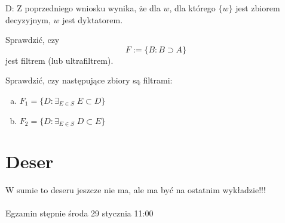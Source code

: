 \documentclass[12pt,a4paper]{article}
\theoremstyle{break}
\begin{document}
	D: Z poprzedniego wniosku wynika, że dla $w$, dla którego $\{w\}$ jest zbiorem decyzyjnym, $w$ jest dyktatorem.
	
	\begin{zad}
		Sprawdzić, czy 
		\[
		F := \{B : B \supset A\}
		\]
		jest filtrem (lub ultrafiltrem).
	\end{zad}
	
	\begin{zad}
		Sprawdzić, czy następujące zbiory są filtrami:
		\begin{enumerate}[a)]
			\item $F_1 = \{D : \exists_{E \in S} \; E \subset D\}$
			\item $F_2 = \{D : \exists_{E \in S} \; D \subset E\}$
		\end{enumerate}
	\end{zad}
	
	
	
	
	
	
	
	
	
	
	
	
	
	
	
	
	
	
	\newpage
	\section{Deser}
	\begin{center}
		{\fontsize{30}{36}\selectfont\faBirthdayCake}
	\end{center} 
	
	W sumie to deseru jeszcze nie ma, ale ma być na ostatnim wykładzie!!! \\\\
	Egzamin stępnie środa 29 stycznia 11:00
	
	
		
	
	

	
	
\end{document}
